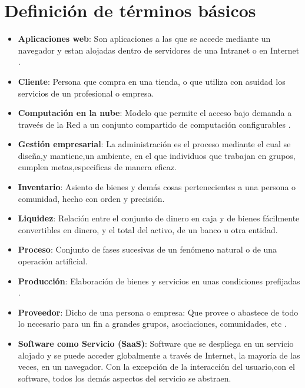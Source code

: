 \section{Definici\'on de t\'erminos b\'asicos}
\begin{itemize}
  \item \textbf{Aplicaciones web}: Son aplicaciones a las que se accede mediante un navegador y estan
        alojadas dentro de servidores de una Intranet o en Internet \citep{nino}.
  \item \textbf{Cliente}: Persona que compra en una tienda, o que utiliza con asuidad los servicios
        de un profesional o empresa\citep{rae}.
  \item \textbf{Computaci\'on en la nube}: Modelo que permite el acceso bajo demanda a trave\'es
        de la Red a un conjunto compartido de computaci\'on configurables \citep{nist}.
  \item \textbf{Gesti\'on empresarial}: La administraci\'on es el proceso mediante el cual
        se dise\~na,y mantiene,un ambiente, en el que individuos que trabajan en grupos,
        cumplen metas,especificas de manera eficaz\citep{koontz}.
  \item \textbf{Inventario}: Asiento de bienes y dem\'as cosas pertenecientes a una persona o
        comunidad, hecho con orden y precisi\'on\citep{rae}.
  \item \textbf{Liquidez}: Relaci\'on entre el conjunto de dinero en caja y de bienes f\'acilmente
        convertibles en dinero, y el total del activo, de un banco u otra
        entidad\citep{rae}.
  \item \textbf{Proceso}: Conjunto de fases sucesivas de un fen\'omeno natural o de una
        operaci\'on artificial\citep{rae}.
  \item \textbf{Producci\'on}: Elaboraci\'on de bienes y servicios en unas condiciones prefijadas \citep{carro}.
  \item \textbf{Proveedor}: Dicho de una persona o empresa: Que provee o abastece de todo lo necesario
        para un fin a grandes grupos, asociaciones, comunidades, etc \citep{rae}.
  \item \textbf{Software como Servicio (SaaS)}: Software que se despliega en un servicio alojado y se
        puede acceder globalmente a trav\'es de Internet, la mayor\'ia de las veces,
        en un navegador. Con la excepci\'on de la interacci\'on del usuario,con el
        software, todos los dem\'as aspectos del servicio se abstraen\citep{sosinsky}.
\end{itemize}
